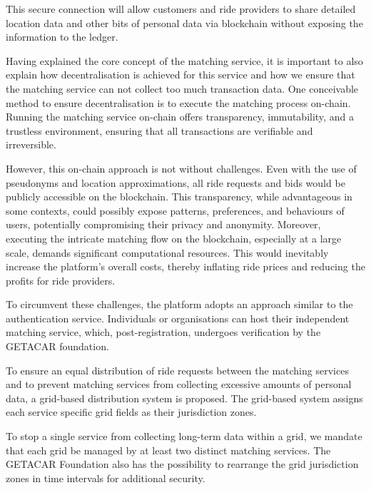 This secure connection will allow customers and ride providers to share detailed location data and other bits of personal data via blockchain without exposing the information to the ledger.

Having explained the core concept of the matching service, it is important to also explain how decentralisation is achieved for this service and how we ensure that the matching service can not collect too much transaction data. One conceivable method to ensure decentralisation is to execute the matching process on-chain. Running the matching service on-chain offers transparency, immutability, and a trustless environment, ensuring that all transactions are verifiable and irreversible.

However, this on-chain approach is not without challenges. Even with the use of pseudonyms and location approximations, all ride requests and bids would be publicly accessible on the blockchain. This transparency, while advantageous in some contexts, could possibly expose patterns, preferences, and behaviours of users, potentially compromising their privacy and anonymity. Moreover, executing the intricate matching flow on the blockchain, especially at a large scale, demands significant computational resources. This would inevitably increase the platform's overall costs, thereby inflating ride prices and reducing the profits for ride providers.

To circumvent these challenges, the platform adopts an approach similar to the authentication service. Individuals or organisations can host their independent matching service, which, post-registration, undergoes verification by the GETACAR foundation. 

To ensure an equal distribution of ride requests between the matching services and to prevent matching services from collecting excessive amounts of personal data, a grid-based distribution system is proposed. The grid-based system assigns each service specific grid fields as their jurisdiction zones.

To stop a single service from collecting long-term data within a grid, we mandate that each grid be managed by at least two distinct matching services. The GETACAR Foundation also has the possibility to rearrange the grid jurisdiction zones in time intervals for additional security.

